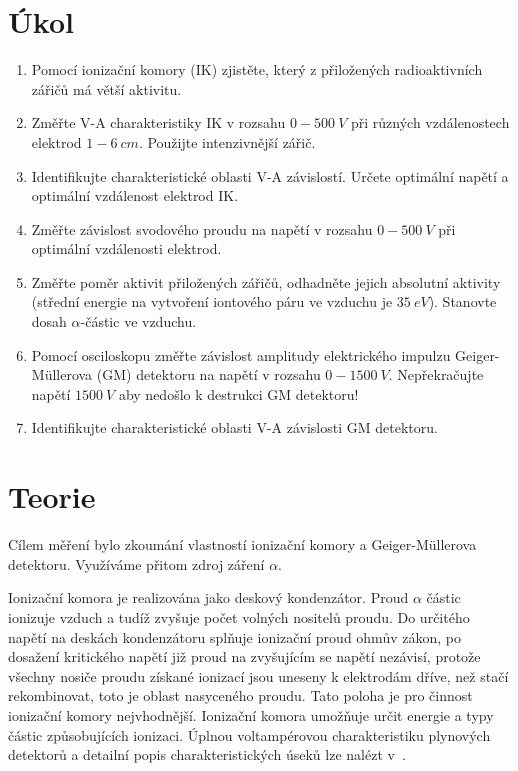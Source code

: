 \documentclass{protokol}
\begin{document}
    \section*{Úkol}
    \small
    \begin{enumerate}
        \item Pomocí ionizační komory (IK) zjistěte, který z přiložených radioaktivních zářičů má větší aktivitu.
        \item Změřte V-A charakteristiky IK v rozsahu $0-\SI{500}{V}$ při různých vzdálenostech elektrod $1-\SI{6}{cm}$.
        Použijte intenzivnější zářič.
        \item Identifikujte charakteristické oblasti V-A závislostí.
        Určete optimální napětí a optimální vzdálenost elektrod IK.
        \item Změřte závislost svodového proudu na napětí v rozsahu $0-\SI{500}{V}$ při optimální vzdálenos\-ti elektrod.
        \item Změřte poměr aktivit přiložených zářičů, odhadněte jejich absolutní aktivity (střední energie na vytvoření iontového páru ve vzduchu je $\SI{35}{eV}$).
        Stanovte dosah $\alpha$-částic ve vzduchu.
        \item Pomocí osciloskopu změřte závislost amplitudy elektrického impulzu Geiger-Müllerova (GM) detektoru na napětí v rozsahu $0-\SI{1500}{V}$.
        Nepřekračujte napětí $\SI{1500}{V}$ aby nedošlo k destrukci GM detektoru!
        \item Identifikujte charakteristické oblasti V-A závislosti GM detektoru.
    \end{enumerate}
    \normalsize
    \section*{Teorie}
    \small
    Cílem měření bylo zkoumání vlastností ionizační komory a Geiger-Müllerova detektoru.
    Využí\-váme přitom zdroj záření $\alpha$.

    Ionizační komora je realizována jako deskový kondenzátor.
    Proud $\alpha$ částic ionizuje vzduch a tudíž zvyšuje počet volných nositelů proudu.
    Do určitého napětí na deskách kondenzátoru splňuje ionizační proud ohmův zákon, po dosažení kritického napětí již proud na zvyšujícím se napětí nezávisí, protože všechny nosiče proudu získané ionizací jsou uneseny k elektrodám dříve, než stačí rekombinovat, toto je oblast nasyceného proudu.
    Tato poloha je pro činnost ionizační komory nejvhodnější.
    Ionizační komora umožňuje určit energie a typy částic způsobu\-jících ionizaci.
    Úplnou voltampérovou charakteristiku plynových detektorů a detailní popis charakteristických úseků lze nalézt v~\cite{pokyny}.
\end{document}

